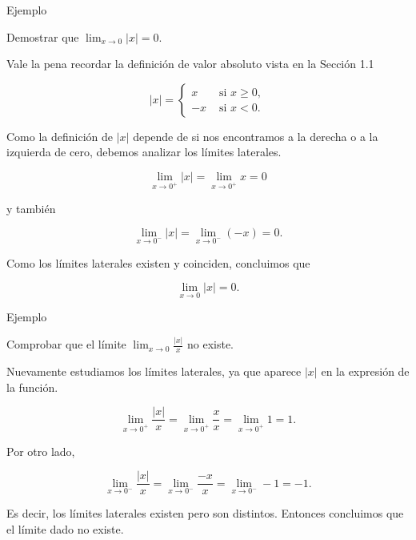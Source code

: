 \documentclass[
  letterpaper,
]{book}
\theoremstyle{plain}
\theoremstyle{remark}
\begin{document}
Ejemplo

Demostrar que \(\displaystyle \lim_{x\to 0} |x|=0\).

\begin{tcolorbox}[enhanced jigsaw, opacityback=0, left=2mm, opacitybacktitle=0.6, toprule=.15mm, bottomrule=.15mm, colbacktitle=quarto-callout-tip-color!10!white, titlerule=0mm, bottomtitle=1mm, title=\textcolor{quarto-callout-tip-color}{\faLightbulb}\hspace{0.5em}{Solución}, toptitle=1mm, colframe=quarto-callout-tip-color-frame, colback=white, breakable, rightrule=.15mm, arc=.35mm, leftrule=.75mm, coltitle=black]

Vale la pena recordar la definición de valor absoluto vista en la
Sección 1.1

\[
|x|=
\begin{cases}
x & \text{ si } x\geq 0,\\
-x & \text{ si } x<0.
\end{cases}
\]

Como la definición de \(|x|\) depende de si nos encontramos a la derecha
o a la izquierda de cero, debemos analizar los límites laterales.

\[
\lim_{x\to 0^+} |x|=\lim_{x\to 0^+} x = 0
\]

y también

\[
\lim_{x\to 0^-} |x|=\lim_{x\to 0^-} (-x) = 0.
\]

Como los límites laterales existen y coinciden, concluimos que

\[
\lim_{x\to 0} |x|=0.
\]

\end{tcolorbox}

Ejemplo

Comprobar que el límite \(\displaystyle \lim_{x\to 0} \frac{|x|}{x}\) no
existe.

\begin{tcolorbox}[enhanced jigsaw, opacityback=0, left=2mm, opacitybacktitle=0.6, toprule=.15mm, bottomrule=.15mm, colbacktitle=quarto-callout-tip-color!10!white, titlerule=0mm, bottomtitle=1mm, title=\textcolor{quarto-callout-tip-color}{\faLightbulb}\hspace{0.5em}{Solución}, toptitle=1mm, colframe=quarto-callout-tip-color-frame, colback=white, breakable, rightrule=.15mm, arc=.35mm, leftrule=.75mm, coltitle=black]

Nuevamente estudiamos los límites laterales, ya que aparece \(|x|\) en
la expresión de la función.

\[
\lim_{x\to 0^+} \frac{|x|}{x}=\lim_{x\to 0^+} \frac{x}{x} = \lim_{x\to 0^+} 1=1.
\]

Por otro lado,

\[
\lim_{x\to 0^-} \frac{|x|}{x}=\lim_{x\to 0^-} \frac{-x}{x} = \lim_{x\to 0^-} -1=-1.
\]

Es decir, los límites laterales existen pero son distintos. Entonces
concluimos que el límite dado no existe.

\end{tcolorbox}
\end{document}
